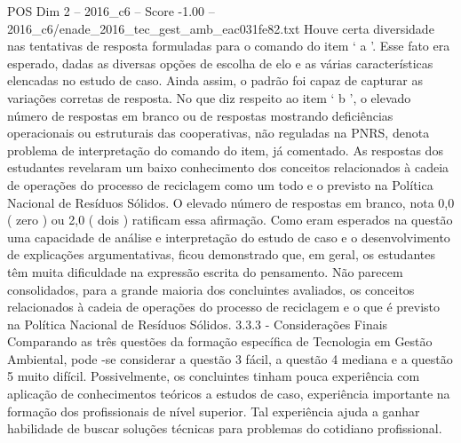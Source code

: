 \begin{textsample}{POS Dim 2 – 2016\_c6 – Score -1.00 – 2016\_c6/enade\_2016\_tec\_gest\_amb\_eac031fe82.txt}
Houve certa diversidade nas tentativas de resposta formuladas para o comando do item ‘ a ’.
Esse fato era esperado, dadas as diversas opções de escolha de elo e as várias características elencadas no estudo de caso.
Ainda assim, o padrão foi capaz de capturar as variações corretas de resposta.
No que diz respeito ao item ‘ b ’, o elevado número de respostas em branco ou de respostas mostrando deficiências operacionais ou estruturais das cooperativas, não reguladas na PNRS, denota problema de interpretação do comando do item, já comentado.
As respostas dos estudantes revelaram um baixo conhecimento dos conceitos relacionados à cadeia de operações do processo de reciclagem como um todo e o previsto na Política Nacional de Resíduos Sólidos.
O elevado número de respostas em branco, nota 0,0 ( zero ) ou 2,0 ( dois ) ratificam essa afirmação.
Como eram esperados na questão uma capacidade de análise e interpretação do estudo de caso e o desenvolvimento de explicações argumentativas, ficou demonstrado que, em geral, os estudantes têm muita dificuldade na expressão escrita do pensamento.
Não parecem consolidados, para a grande maioria dos concluintes avaliados, os conceitos relacionados à cadeia de operações do processo de reciclagem e o que é previsto na Política Nacional de Resíduos Sólidos. 3.3.3 - Considerações Finais Comparando as três questões da formação específica de Tecnologia em Gestão Ambiental, pode -se considerar a questão 3 fácil, a questão 4 mediana e a questão 5 muito difícil.
Possivelmente, os concluintes tinham pouca experiência com aplicação de conhecimentos teóricos a estudos de caso, experiência importante na formação dos profissionais de nível superior.
Tal experiência ajuda a ganhar habilidade de buscar soluções técnicas para problemas do cotidiano profissional.

\end{textsample}
